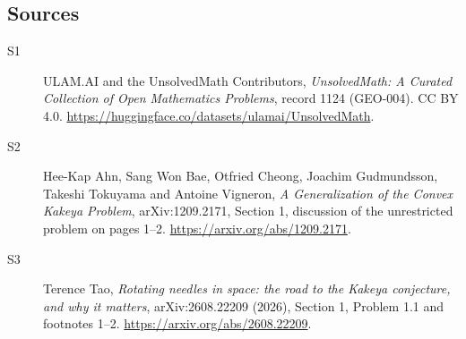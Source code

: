 \documentclass[11pt]{article}
\begin{document}
\subsection{Sources}
\begin{description}
\item[\hypertarget{source:1124:1}{S1}] ULAM.AI and the UnsolvedMath Contributors, \emph{UnsolvedMath: A Curated Collection of Open Mathematics Problems}, record 1124 (GEO-004). CC BY 4.0. \url{https://huggingface.co/datasets/ulamai/UnsolvedMath}.
\item[\hypertarget{source:1124:2}{S2}] Hee-Kap Ahn, Sang Won Bae, Otfried Cheong, Joachim Gudmundsson, Takeshi Tokuyama and Antoine Vigneron, \emph{A Generalization of the Convex Kakeya Problem}, arXiv:1209.2171, Section 1, discussion of the unrestricted problem on pages 1--2. \url{https://arxiv.org/abs/1209.2171}.
\item[\hypertarget{source:1124:3}{S3}] Terence Tao, \emph{Rotating needles in space: the road to the Kakeya conjecture, and why it matters}, arXiv:2608.22209 (2026), Section 1, Problem 1.1 and footnotes 1--2. \url{https://arxiv.org/abs/2608.22209}.
\end{description}
\label{end:1124}
\end{document}

